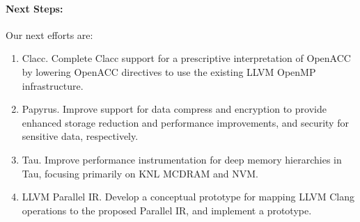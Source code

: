 \paragraph{Next Steps:}

Our next efforts are:

\begin{enumerate}
	\item Clacc. Complete Clacc support for a prescriptive interpretation of OpenACC by lowering OpenACC directives to use the existing LLVM OpenMP infrastructure.
    
	\item Papyrus. Improve support for data compress and encryption to provide enhanced storage reduction and performance improvements, and security for sensitive data, respectively.
    
    \item Tau. Improve performance instrumentation for deep memory hierarchies in Tau, focusing primarily on KNL MCDRAM and NVM.
    
    \item LLVM Parallel IR. Develop a conceptual prototype for mapping LLVM Clang operations to the proposed Parallel IR, and implement a prototype.

\end{enumerate}
